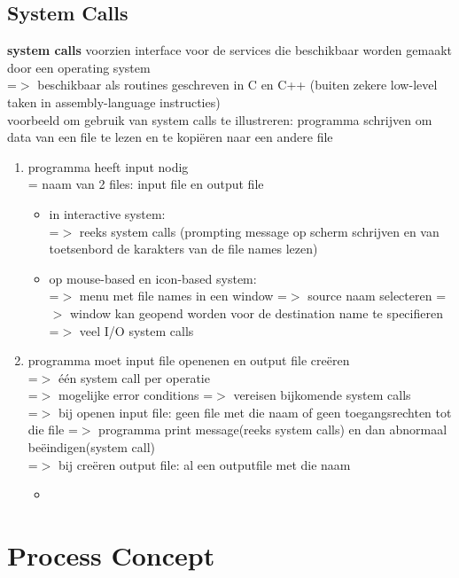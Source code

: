 \documentclass{report}
\begin{document}
\section{System Calls}
\textbf{system calls} voorzien interface voor de services die beschikbaar worden gemaakt door een operating system 
\\=$>$ beschikbaar als routines geschreven in C en C++ (buiten zekere low-level taken in assembly-language instructies)
\\ voorbeeld om gebruik van system calls te illustreren: programma schrijven om data van een file te lezen en te kopi\"eren naar een andere file
\begin{enumerate}
\item programma heeft input nodig
\\= naam van 2 files: input file en output file
\begin{itemize}
\item in interactive system:
\\=$>$ reeks system calls (prompting message op scherm schrijven en van toetsenbord de karakters van de file names lezen)
\item op mouse-based en icon-based system:
\\=$>$ menu met file names in een window =$>$ source naam selecteren =$>$ window kan geopend worden voor de destination name te specifieren
\\=$>$ veel I/O system calls
\end{itemize}
\item programma moet input file openenen en output file cre\"eren
\\=$>$ \'e\'en system call per operatie
\\=$>$ mogelijke error conditions =$>$ vereisen bijkomende system calls
\\=$>$ bij openen input file: geen file met die naam of geen toegangsrechten tot die file =$>$ programma print message(reeks system calls) en dan abnormaal be\"eindigen(system call)
\\=$>$ bij cre\"eren output file: al een outputfile met die naam
\begin {itemize}
\item 
\end {itemize}

\end{enumerate}


\chapter{Process Concept}
\end{document}
